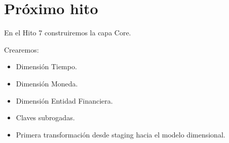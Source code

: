 \section{Próximo hito}

En el Hito 7 construiremos la capa Core.

Crearemos:

\begin{itemize}
\item Dimensión Tiempo.
\item Dimensión Moneda.
\item Dimensión Entidad Financiera.
\item Claves subrogadas.
\item Primera transformación desde staging hacia el modelo dimensional.
\end{itemize}
